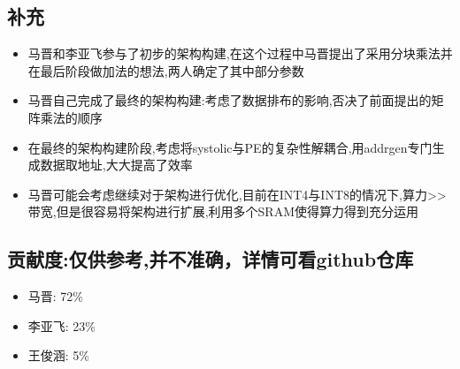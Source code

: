 \documentclass[zihao=-4, UTF8]{ctexart}
\begin{document}
\subsection{补充}
\begin{itemize}
    \item 马晋和李亚飞参与了初步的架构构建,在这个过程中马晋提出了采用分块乘法并在最后阶段做加法的想法,两人确定了其中部分参数
    \item 马晋自己完成了最终的架构构建:考虑了数据排布的影响,否决了前面提出的矩阵乘法的顺序
    \item 在最终的架构构建阶段,考虑将systolic与PE的复杂性解耦合,用addrgen专门生成数据取地址,大大提高了效率
    \item 马晋可能会考虑继续对于架构进行优化,目前在INT4与INT8的情况下,算力>>带宽,但是很容易将架构进行扩展,利用多个SRAM使得算力得到充分运用
\end{itemize}
\subsection{贡献度:仅供参考,并不准确，详情可看github仓库}
\begin{itemize}
    \item 马晋: 72\%
    \item 李亚飞: 23\%
    \item 王俊涵: 5\%
\end{itemize}
\end{document}
